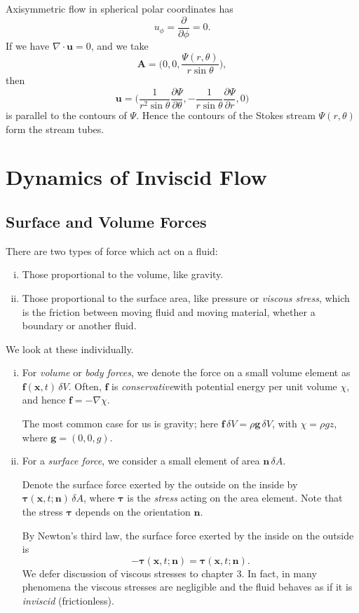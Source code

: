 \documentclass[12pt]{article}
\begin{document}
Axisymmetric flow in spherical polar coordinates has
\[
u_{\phi} = \frac{\partial}{\partial \phi} = 0
.\]
If we have $\nabla \cdot \mathbf{u} = 0$, and we take
\[
\mathbf{A} = \biggl( 0, 0, \frac{\Psi(r, \theta)}{r \sin \theta} \biggr)
,\]
then
\[
\mathbf{u} = \biggl( \frac{1}{r^2 \sin \theta} \frac{\partial \Psi}{\partial \theta}, - \frac{1}{r \sin \theta} \frac{\partial \Psi}{\partial r}, 0 \biggr)
\]
is parallel to the contours of $\Psi$. Hence the contours of the Stokes stream $\Psi(r, \theta)$ form the stream tubes.

\newpage

\section{Dynamics of Inviscid Flow}
\label{sec:dynamics_of_inviscid_flow}

\subsection{Surface and Volume Forces}
\label{sub:surface_and_volume_forces}

There are two types of force which act on a fluid:
\begin{enumerate}[(i)]
	\item Those proportional to the volume, like gravity.
	\item Those proportional to the surface area, like pressure or \emph{viscous stress}, which is the friction between moving fluid and moving material, whether a boundary or another fluid.
\end{enumerate}
We look at these individually.

\begin{enumerate}[(i)]
	\item For \emph{volume} or \emph{body forces}, we denote the force on a small volume element as $\mathbf{f}(\mathbf{x},t)\, \delta V$. Often, $\mathbf{f}$ is \emph{conservative}with potential energy per unit volume $\chi$, and hence $\mathbf{f} = - \nabla \chi$.

		The most common case for us is gravity; here $\mathbf{f} \, \delta V = \rho \mathbf{g} \, \delta V$, with $\chi = \rho g z$, where $\mathbf{g} = (0, 0, g)$.
	\item For a \emph{surface force}, we consider a small element of area $\mathbf{n} \, \delta A$.

		Denote the surface force exerted by the outside on the inside by $\bm{\tau}(\mathbf{x}, t ; \mathbf{n}) \, \delta A$, where $\bm{\tau}$ is the \emph{stress} acting on the area element. Note that the stress $\bm{\tau}$ depends on the orientation $\mathbf{n}$.

		By Newton's third law, the surface force exerted by the inside on the outside is
		\[
		- \bm{\tau}(\mathbf{x}, t;\mathbf{n}) = \bm{\tau}(\mathbf{x}, t; \mathbf{n})
		.\]
		We defer discussion of viscous stresses to chapter 3. In fact, in many phenomena the viscous stresses are negligible and the fluid behaves as if it is \emph{inviscid} (frictionless).
\end{enumerate}
\end{document}
